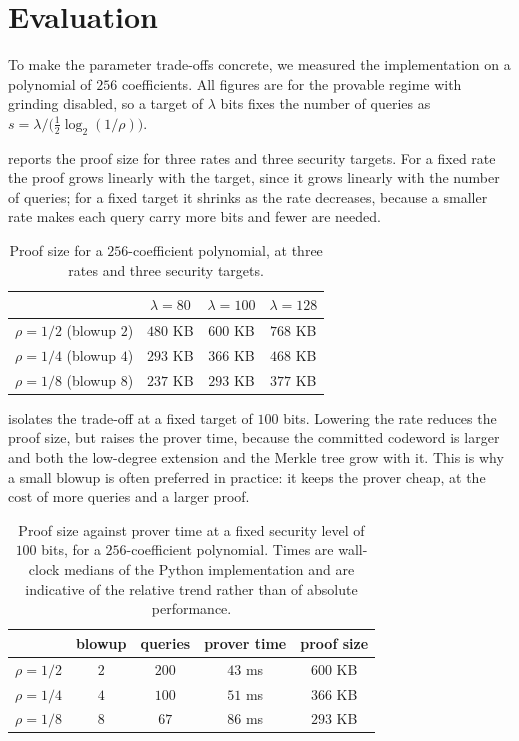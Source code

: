 \section{Evaluation}
\label{sec:impl_evaluation}

To make the parameter trade-offs concrete, we measured the
implementation on a polynomial of $256$ coefficients. All figures are for
the provable regime with grinding disabled, so a target of $\lambda$ bits
fixes the number of queries as
$s = \lambda / \bigl(\tfrac12\log_2(1/\rho)\bigr)$.

 reports the proof size for three rates and three
security targets. For a fixed rate the proof grows linearly with the
target, since it grows linearly with the number of queries; for a fixed
target it shrinks as the rate decreases, because a smaller rate makes
each query carry more bits and fewer are needed.

\begin{table}[ht]
\centering
\begin{tabular}{lccc}
\hline
 & $\lambda = 80$ & $\lambda = 100$ & $\lambda = 128$ \\
\hline
$\rho = 1/2$ (blowup $2$) & $480$ KB & $600$ KB & $768$ KB \\
$\rho = 1/4$ (blowup $4$) & $293$ KB & $366$ KB & $468$ KB \\
$\rho = 1/8$ (blowup $8$) & $237$ KB & $293$ KB & $377$ KB \\
\hline
\end{tabular}
\caption{Proof size for a $256$-coefficient polynomial, at three rates
and three security targets.}
\label{tab:proofsize}
\end{table}

 isolates the trade-off at a fixed target of $100$
bits. Lowering the rate reduces the proof size, but raises the prover
time, because the committed codeword is larger and both the low-degree
extension and the Merkle tree grow with it. This is why a small blowup is
often preferred in practice: it keeps the prover cheap, at the cost of
more queries and a larger proof.

\begin{table}[ht]
\centering
\begin{tabular}{lcccc}
\hline
 & blowup & queries & prover time & proof size \\
\hline
$\rho = 1/2$ & $2$ & $200$ & $43$ ms & $600$ KB \\
$\rho = 1/4$ & $4$ & $100$ & $51$ ms & $366$ KB \\
$\rho = 1/8$ & $8$ & $67$  & $86$ ms & $293$ KB \\
\hline
\end{tabular}
\caption{Proof size against prover time at a fixed security level of
$100$ bits, for a $256$-coefficient polynomial. Times are wall-clock
medians of the Python implementation and are indicative of the relative
trend rather than of absolute performance.}
\label{tab:tradeoff}
\end{table}

